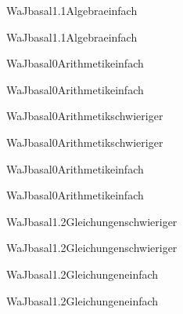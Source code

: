 \documentclass[12pt]{article}
\begin{document}
\begin{Add}{WaJ}{basal1.1}{Algebra}{einfach}
\solution{ }
\end{Add}
\begin{Add}{WaJ}{basal1.1}{Algebra}{einfach}
\end{Add}

\begin{Add}{WaJ}{basal0}{Arithmetik}{einfach}
\solution{ }
\end{Add}
\begin{Add}{WaJ}{basal0}{Arithmetik}{einfach}
\end{Add}

\begin{Add}{WaJ}{basal0}{Arithmetik}{schwieriger}
\solution{ }
\end{Add}
\begin{Add}{WaJ}{basal0}{Arithmetik}{schwieriger}
\end{Add}

\begin{Add}{WaJ}{basal0}{Arithmetik}{einfach}
\solution{ }
\end{Add}
\begin{Add}{WaJ}{basal0}{Arithmetik}{einfach}
\end{Add}

\begin{Add}{WaJ}{basal1.2}{Gleichungen}{schwieriger}
\solution{ }
\end{Add}
\begin{Add}{WaJ}{basal1.2}{Gleichungen}{schwieriger}
\end{Add}

\begin{Add}{WaJ}{basal1.2}{Gleichungen}{einfach}
\solution{ }
\end{Add}
\begin{Add}{WaJ}{basal1.2}{Gleichungen}{einfach}
\end{Add}
\end{document}
